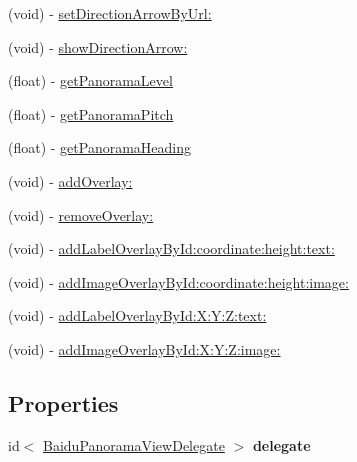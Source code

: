\begin{DoxyCompactItemize}
(void) -\/ \hyperlink{interface_baidu_panorama_view_aae8ed54ef190955aebe6653fbb082c55}{set\+Direction\+Arrow\+By\+Url\+:}
\item 
(void) -\/ \hyperlink{interface_baidu_panorama_view_ad404423fcbedbe17ae1847b7d06d77cc}{show\+Direction\+Arrow\+:}
\item 
(float) -\/ \hyperlink{interface_baidu_panorama_view_a12eb61616611c1c9e4947c026fb2cd59}{get\+Panorama\+Level}
\item 
(float) -\/ \hyperlink{interface_baidu_panorama_view_a29058d625d12c70ab5531f46ccee36e7}{get\+Panorama\+Pitch}
\item 
(float) -\/ \hyperlink{interface_baidu_panorama_view_af8634de5c37aa6a2b81ea161afed5b96}{get\+Panorama\+Heading}
\item 
(void) -\/ \hyperlink{interface_baidu_panorama_view_a1e534ac6f4342ed0ce7b6208387033f5}{add\+Overlay\+:}
\item 
(void) -\/ \hyperlink{interface_baidu_panorama_view_ae668b98f9036b7e50b0e7dc217fa8620}{remove\+Overlay\+:}
\item 
(void) -\/ \hyperlink{interface_baidu_panorama_view_af0d2fe0e5b5a7b67524b099d3cffcb83}{add\+Label\+Overlay\+By\+Id\+:coordinate\+:height\+:text\+:}
\item 
(void) -\/ \hyperlink{interface_baidu_panorama_view_ab851a3202611951265c474a226970f42}{add\+Image\+Overlay\+By\+Id\+:coordinate\+:height\+:image\+:}
\item 
(void) -\/ \hyperlink{interface_baidu_panorama_view_a372977bf92e0fddaa6693d95ffd5fb75}{add\+Label\+Overlay\+By\+Id\+:\+X\+:\+Y\+:\+Z\+:text\+:}
\item 
(void) -\/ \hyperlink{interface_baidu_panorama_view_ad8e1723b9122ffc20d7d719f630c4209}{add\+Image\+Overlay\+By\+Id\+:\+X\+:\+Y\+:\+Z\+:image\+:}
\end{DoxyCompactItemize}
\subsection*{Properties}
\begin{DoxyCompactItemize}
\item 
\hypertarget{interface_baidu_panorama_view_a630c3f630363be02283942719ea05e61}{}id$<$ \hyperlink{protocol_baidu_panorama_view_delegate-p}{Baidu\+Panorama\+View\+Delegate} $>$ {\bfseries delegate}\label{interface_baidu_panorama_view_a630c3f630363be02283942719ea05e61}

\end{DoxyCompactItemize}


